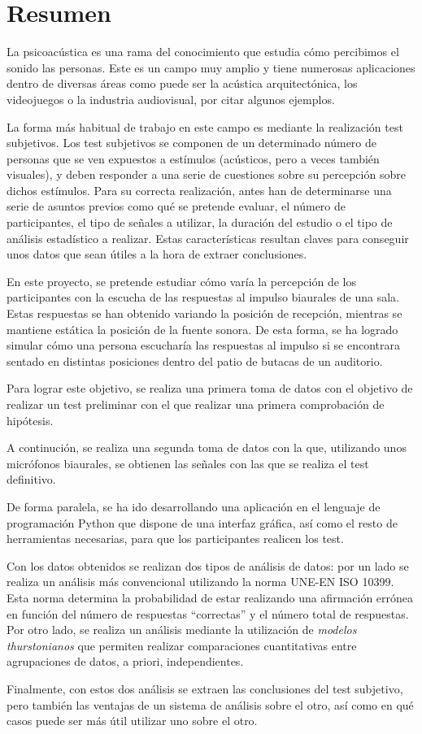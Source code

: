 \documentclass[11pt,a4paper,twoside]{book}
\author{Víctor de Tejada Molera}
\begin{document}
\chapter*{Resumen}
La psicoacústica es una rama del conocimiento que estudia cómo percibimos el sonido las personas. Este es un campo muy amplio y tiene numerosas aplicaciones dentro de diversas áreas como puede ser la acústica arquitectónica, los videojuegos o la industria audiovisual, por citar algunos ejemplos.

    La forma más habitual de trabajo en este campo es mediante la realización test subjetivos. Los test subjetivos se componen de un determinado número de personas que se ven expuestos a estímulos (acústicos, pero a veces también visuales), y deben responder a una serie de cuestiones sobre su percepción sobre dichos estímulos. Para su correcta realización, antes han de determinarse una serie de asuntos previos como qué se pretende evaluar, el número de participantes, el tipo de señales a utilizar, la duración del estudio o el tipo de análisis estadístico a realizar. Estas características resultan claves para conseguir unos datos que sean útiles a la hora de extraer conclusiones.\newline

    En este proyecto, se pretende estudiar cómo varía la percepción de los participantes con la escucha de las respuestas al impulso biaurales de una sala. Estas respuestas se han obtenido variando la posición de recepción, mientras se mantiene estática la posición de la fuente sonora. De esta forma, se ha logrado simular cómo una persona escucharía las respuestas al impulso si se encontrara sentado en distintas posiciones dentro del patio de butacas de un auditorio.

    Para lograr este objetivo, se realiza una primera toma de datos con el objetivo de realizar un test preliminar con el que realizar una primera comprobación de hipótesis. 

    A continución, se realiza una segunda toma de datos con la que, utilizando unos micrófonos biaurales, se obtienen las señales con las que se realiza el test definitivo.

    De forma paralela, se ha ido desarrollando una aplicación en el lenguaje de programación Python que dispone de una interfaz gráfica, así como el resto de herramientas necesarias, para que los participantes realicen los test.

    Con los datos obtenidos se realizan dos tipos de análisis de datos: por un lado se realiza un análisis más convencional utilizando la norma UNE-EN ISO 10399. Esta norma determina la probabilidad de estar realizando una afirmación errónea en función del número de respuestas ``correctas'' y el número total de respuestas. Por otro lado, se realiza un análisis mediante la utilización de \textit{modelos thurstonianos} que permiten realizar comparaciones cuantitativas entre agrupaciones de datos, a priori, independientes.

    Finalmente, con estos dos análisis se extraen las conclusiones del test subjetivo, pero también las ventajas de un sistema de análisis sobre el otro, así como en qué casos puede ser más útil utilizar uno sobre el otro.
    
    
\end{document}
